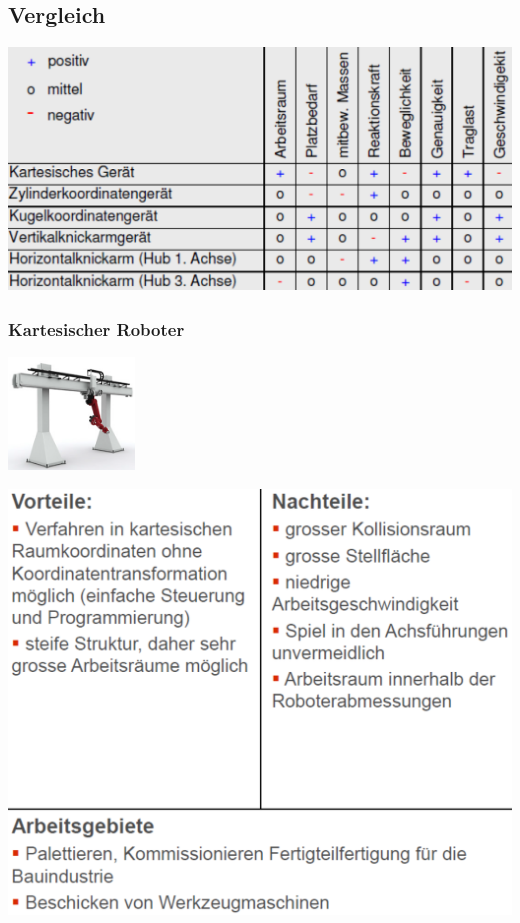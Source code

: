 \begin{minipage}{0.5\linewidth}
    \subsection*{Vergleich}
    \includegraphics[width=\linewidth]{./bilder/RoboVergleich}
    \subsubsection{Kartesischer Roboter}
    \includegraphics[height=3cm]{./bilder/PortalRobo}
    
    \includegraphics[width=\linewidth]{./bilder/kartRobo}
\end{minipage}
